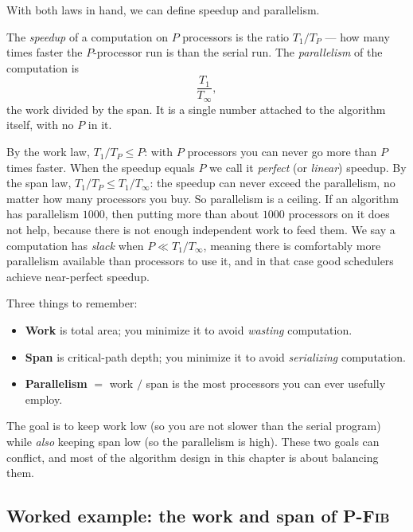 With both laws in hand, we can define speedup and parallelism.

\begin{definition}\label{ch35:def-speedup}
The \emph{speedup} of a computation on $P$ processors is the ratio
$T_1 / T_P$ --- how many times faster the $P$-processor run is than the serial
run. The \emph{parallelism} of the computation is
\[
\frac{T_1}{T_\infty},
\]
the work divided by the span. It is a single number attached to the algorithm
itself, with no $P$ in it.
\end{definition}

By the work law, $T_1/T_P \le P$: with $P$ processors you can never go more than
$P$ times faster. When the speedup equals $P$ we call it \emph{perfect} (or
\emph{linear}) speedup. By the span law, $T_1/T_P \le T_1/T_\infty$: the speedup
can never exceed the parallelism, no matter how many processors you buy. So
parallelism is a ceiling. If an algorithm has parallelism $1000$, then putting
more than about $1000$ processors on it does not help, because there is not
enough independent work to feed them. We say a computation has \emph{slack} when $P \ll T_1/T_\infty$, meaning
there is comfortably more parallelism available than processors to use it, and in
that case good schedulers achieve near-perfect speedup.

\begin{focusbox}
Three things to remember:
\begin{itemize}
\item \textbf{Work} is total area; you minimize it to avoid \emph{wasting}
computation.
\item \textbf{Span} is critical-path depth; you minimize it to avoid
\emph{serializing} computation.
\item \textbf{Parallelism} $=$ work $/$ span is the most processors you can ever
usefully employ.
\end{itemize}
The goal is to keep work low (so you are not slower than the serial program) while
\emph{also} keeping span low (so the parallelism is high). These two goals can
conflict, and most of the algorithm design in this chapter is about balancing them.
\end{focusbox}

\subsection{Worked example: the work and span of \textsc{P-Fib}}

